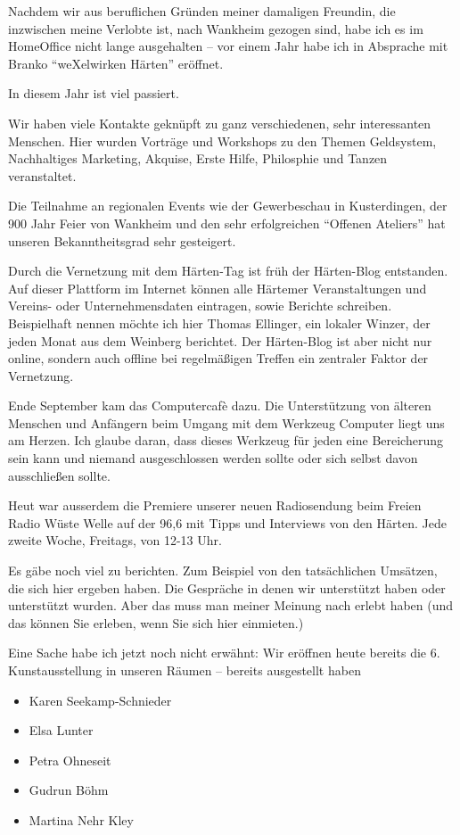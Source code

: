 \begin{appendix}
Nachdem wir aus beruflichen Gründen meiner damaligen Freundin, die inzwischen meine Verlobte ist, nach Wankheim gezogen sind, habe ich es im HomeOffice nicht lange ausgehalten – vor einem Jahr habe ich in Absprache mit Branko "`weXelwirken Härten"' eröffnet.

In diesem Jahr ist viel passiert.

Wir haben viele Kontakte geknüpft zu ganz verschiedenen, sehr interessanten Menschen. Hier wurden Vorträge und Workshops zu den Themen Geldsystem, Nachhaltiges Marketing, Akquise, Erste Hilfe, Philosphie und Tanzen veranstaltet.

Die Teilnahme an regionalen Events wie der Gewerbeschau in Kusterdingen, der 900 Jahr Feier von Wankheim und den sehr erfolgreichen "`Offenen Ateliers"' hat unseren Bekanntheitsgrad sehr gesteigert.

Durch die Vernetzung mit dem Härten-Tag ist früh der Härten-Blog entstanden. Auf dieser Plattform im Internet können alle Härtemer Veranstaltungen und Vereins- oder Unternehmensdaten eintragen, sowie Berichte schreiben. Beispielhaft nennen möchte ich hier Thomas Ellinger, ein lokaler Winzer, der jeden Monat aus dem Weinberg berichtet. Der Härten-Blog ist aber nicht nur online, sondern auch offline bei regelmäßigen Treffen ein zentraler Faktor der Vernetzung.

Ende September kam das Computercafè dazu. Die Unterstützung von älteren Menschen und Anfängern beim Umgang mit dem Werkzeug Computer liegt uns am Herzen. Ich glaube daran, dass dieses Werkzeug für jeden eine Bereicherung sein kann und niemand ausgeschlossen werden sollte oder sich selbst davon ausschließen sollte.

Heut war ausserdem die Premiere unserer neuen Radiosendung beim Freien Radio Wüste Welle auf der 96,6 mit Tipps und Interviews von den Härten. Jede zweite Woche, Freitags, von 12-13 Uhr.

Es gäbe noch viel zu berichten. Zum Beispiel von den tatsächlichen Umsätzen, die sich hier ergeben haben. Die Gespräche in denen wir unterstützt haben oder unterstützt wurden. Aber das muss man meiner Meinung nach erlebt haben (und das können Sie erleben, wenn Sie sich hier einmieten.)

Eine Sache habe ich jetzt noch nicht erwähnt:
Wir eröffnen heute bereits die 6. Kunstausstellung in unseren Räumen – bereits ausgestellt haben
\begin{itemize}
\item{Karen Seekamp-Schnieder}
\item{Elsa Lunter}
\item{Petra Ohneseit}
\item{Gudrun Böhm}
\item{Martina Nehr Kley}
\end{itemize}


\end{appendix}
